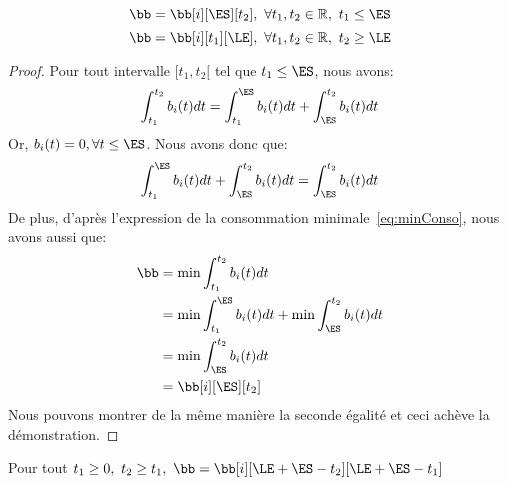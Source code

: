 \begin{lemma}
\label{lem:sym1}
  \[\bb=\bb[i][\ES][t_2], \ \forall t_1,t_2 \in \mathbb{R},\ t_1 \le \ES\]
  \[\bb=\bb[i][t_1][\LE], \ \forall t_1,t_2 \in \mathbb{R},\ t_2 \ge
    \LE\]
\end{lemma}

\begin{proof}
Pour tout intervalle $[t_1,t_2[$ tel que $t_1 \le \ES$, nous avons:
\[ \int_{t_1}^{t_2} b_i(t)dt = \int_{t_1}^{\ES} b_i(t)dt+\int_{\ES}^{t_2} b_i(t)dt\]
Or, $b_i(t)=0, \forall t \le \ES$. Nous avons donc que:
\[\int_{t_1}^{\ES} b_i(t)dt+\int_{\ES}^{t_2} b_i(t)dt=
  \int_{\ES}^{t_2} b_i(t)dt\]
De plus, d'après l'expression de la consommation
minimale~\eqref{eq:minConso}, nous avons aussi que:
\begin{align*}
  \bb &= \min \int_{t_1}^{t_2} b_i(t)dt \\
 &=\min \int_{t_1}^{\ES} b_i(t)dt+ \min \int_{\ES}^{t_2} b_i(t)dt\\
  &= \min \int_{\ES}^{t_2} b_i(t)dt\\
 & = \bb[i][\ES][t_2]
\end{align*}
Nous pouvons montrer de la même manière la seconde égalité et ceci
achève la démonstration.
\end{proof}


\begin{lemma}
\label{lem:sym2}
Pour tout $t_1 \ge 0,\ t_2 \ge t_1,\ \bb= \bb[i][\LE+\ES-t_2][\LE +
\ES -t_1]$ 
\end{lemma}

